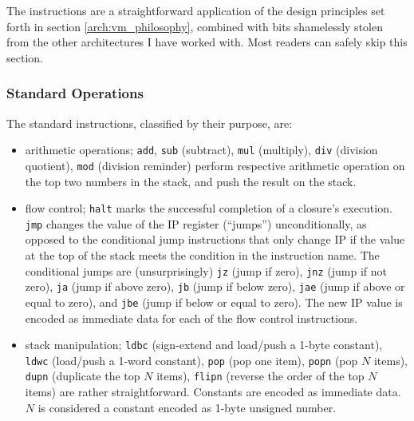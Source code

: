 The instructions are a straightforward application of the design principles set
forth in section \ref{arch:vm_philosophy}, combined with bits shamelessly
stolen from the other architectures I have worked with. Most readers can safely
skip this section.

\subsubsection{Standard Operations}
The standard instructions, classified by their purpose, are:
\begin{itemize}
  \item arithmetic operations; \texttt{add}, \texttt{sub} (subtract),
  \texttt{mul} (multiply), \texttt{div} (division quotient), \texttt{mod}
  (division reminder) perform respective arithmetic operation on the top two
  numbers in the stack, and push the result on the stack.
  \item flow control; \texttt{halt} marks the successful completion of a
  closure's execution. \texttt{jmp} changes the value of the IP register
  (``jumps'') unconditionally, as opposed to the conditional jump instructions that only change IP if the value at the top of the stack meets the condition in the instruction name. The conditional jumps are (unsurprisingly) \texttt{jz} (jump if zero), \texttt{jnz} (jump if not zero),
  \texttt{ja} (jump if above zero), \texttt{jb} (jump if below zero),
  \texttt{jae} (jump if above or equal to zero), and \texttt{jbe} (jump if
  below or equal to zero). The new IP value is encoded as immediate data for
  each of the flow control instructions.
  \item stack manipulation; \texttt{ldbc} (sign-extend and load/push a 1-byte
  constant), \texttt{ldwc} (load/push a 1-word constant), \texttt{pop} (pop one
  item), \texttt{popn} (pop $N$ items), \texttt{dupn} (duplicate the top $N$
  items), \texttt{flipn} (reverse the order of the top $N$ items) are rather
  straightforward. Constants are encoded as immediate data. $N$ is considered a
  constant encoded as 1-byte unsigned number.
\end{itemize}

